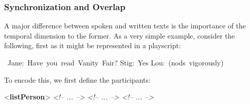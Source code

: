 \subsubsection[{Synchronization and Overlap}]{Synchronization and Overlap}\label{TSSAPA}\par
A major difference between spoken and written texts is the importance of the temporal dimension to the former. As a very simple example, consider the following, first as it might be represented in a playscript: \par\bgroup\exampleFont \begin{shaded}\noindent\mbox{} Jane: Have you read Vanity Fair?\newline
Stig: Yes\newline
Lou: (nods vigorously)\end{shaded}\egroup\par \noindent  To encode this, we first define the participants: \par\bgroup{}\exampleFont \begin{shaded}\noindent\mbox{}{<\textbf{listPerson}>}\mbox{}\newline 
{}\mbox{}\newline 
\textit{<!-- ... -->}\mbox{}\newline 
{}\mbox{}\newline 
{}\mbox{}\newline 
\textit{<!-- ... -->}\mbox{}\newline 
{}\mbox{}\newline 
{}\mbox{}\newline 
\textit{<!-- ... -->}\mbox{}\newline 
{}\mbox{}\newline 

\end{shaded}
